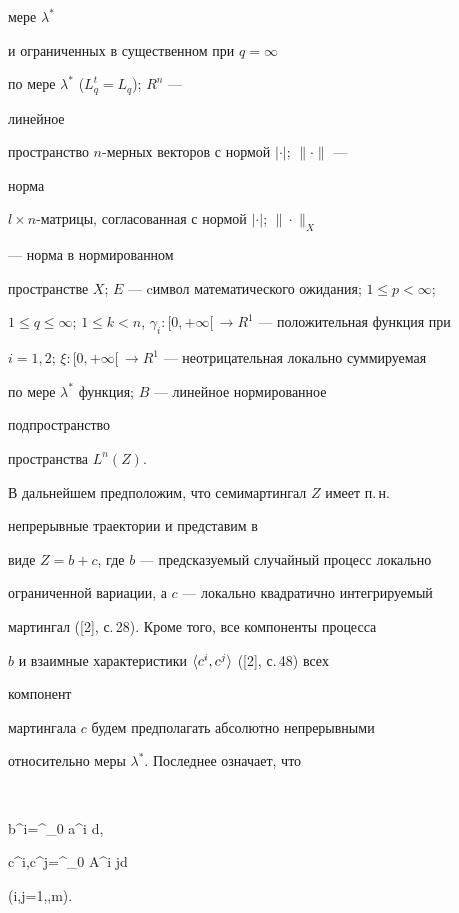 мере $\lambda^*$ 


и ограниченных в существенном при $q=\infty$


по мере $\lambda^*$ ($L^t_q=L_q$); $R^n$ --- 


линейное 


пространство $n$-мерных векторов с нормой $|\cdot|$; $\|\cdot\|$ --- 


норма 


$l\times n$-матрицы, согласованная с нормой $|\cdot|$; $\|\cdot\|_X$ 


--- норма в нормированном 


пространстве $X$; $E$ --- cимвол математического ожидания; $1\le 


p<\infty$; 


$1\le q\le\infty$; $1\le k<n$, $\gamma_i:[0,+\infty[\, 


\to R^1$ --- положительная функция при 


$i=1,2$; $\xi:[0,+\infty[\, 


\to R^1$ --- неотрицательная локально суммируемая 


по мере $\lambda^*$ функция; $B$ --- линейное нормированное 


подпространство 


пространства $L^n(Z)$. 


 


В дальнейшем предположим, что семимартингал $Z$ имеет п.\,н.


непрерывные траектории и представим в 


виде $Z=b+c$, где $b$ --- предсказуемый случайный процесс локально 


ограниченной вариации, а $c$ --- локально квадратично интегрируемый 


мартингал ([2], с.\,28). Кроме того, все компоненты процесса 


$b$ и взаимные характеристики $\langle c^i,c^j\rangle$ ([2], с.\,48) всех 


компонент 


мартингала $c$ будем предполагать абсолютно непрерывными 


относительно меры $\lambda^*$. Последнее означает, что 


$$ 


b^i=\int^{\displaystyle\cdot}_0 a^i d\lambda,\quad 


\la c^i,c^j\ra=\int^{\displaystyle\cdot}_0 A^{i j}d\lambda 


\quad (i,j=1,\dotsc,m). 


